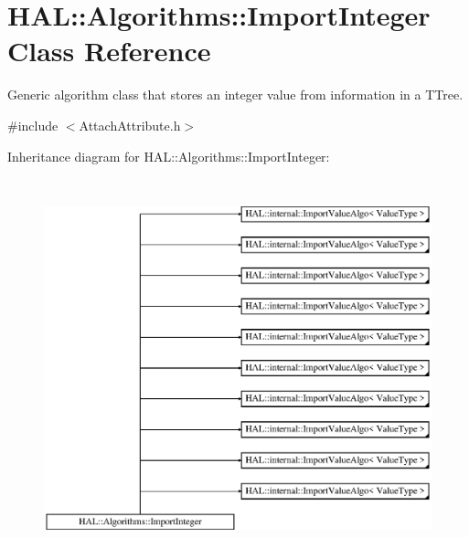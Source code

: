 \hypertarget{class_h_a_l_1_1_algorithms_1_1_import_integer}{\section{H\+A\+L\+:\+:Algorithms\+:\+:Import\+Integer Class Reference}
\label{class_h_a_l_1_1_algorithms_1_1_import_integer}
}


Generic algorithm class that stores an integer value from information in a T\+Tree.  




{\ttfamily \#include $<$Attach\+Attribute.\+h$>$}

Inheritance diagram for H\+A\+L\+:\+:Algorithms\+:\+:Import\+Integer\+:\begin{figure}[H]
\begin{center}
\leavevmode
\includegraphics[height=11.000000cm]{class_h_a_l_1_1_algorithms_1_1_import_integer}
\end{center}
\end{figure}

